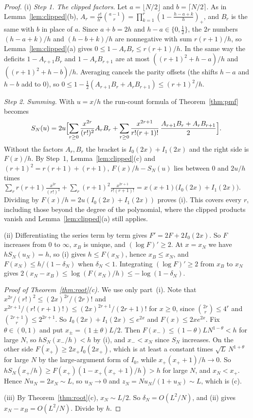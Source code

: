 \begin{proof}
(i) \emph{Step 1. The clipped factors.} Let $a=\lfloor N/2\rfloor$ and
$b=\lceil N/2\rceil$. As in Lemma~\ref{lem:clipped}(b),
$A_r=\frac{r!}{h^r}\binom{a-1}{r}=\prod_{k=1}^r(1-\frac{h-a+k}h)_+$, and $B_r$
is the same with $b$ in place of $a$. Since $a+b=2h$ and $h-a\in\{0,\frac12\}$,
the $2r$ numbers $(h-a+k)/h$ and $(h-b+k)/h$ are nonnegative with sum
$r(r+1)/h$, so Lemma~\ref{lem:clipped}(a) gives $0\le1-A_rB_r\le r(r+1)/h$. In
the same way the deficits $1-A_{r+1}B_r$ and $1-A_rB_{r+1}$ are at most
$((r+1)^2+h-a)/h$ and $((r+1)^2+h-b)/h$. Averaging cancels the parity offsets
(the shifts $h-a$ and $h-b$ add to $0$), so $0\le1-\frac12(A_{r+1}B_r+A_rB_{r+1})\le(r+1)^2/h$.

\emph{Step 2. Summing.} With $u=x/h$ the run-count formula of
Theorem~\ref{thm:pmf} becomes
\[
S_N(u)=2u\Bigl[\sum_{r\ge0}\frac{x^{2r}}{(r!)^2}A_rB_r
+\sum_{r\ge0}\frac{x^{2r+1}}{r!(r+1)!}\,\frac{A_{r+1}B_r+A_rB_{r+1}}2\Bigr].
\]
Without the factors $A_r,B_r$ the bracket is $I_0(2x)+I_1(2x)$ and the right
side is $F(x)/h$. By Step~1, Lemma~\ref{lem:clipped}(c) and $(r+1)^2=r(r+1)+(r+1)$, $F(x)/h-S_N(u)$
lies between $0$ and $2u/h$ times
$\sum_rr(r+1)\frac{x^{2r}}{(r!)^2}+\sum_r(r+1)^2\frac{x^{2r+1}}{r!(r+1)!}=x(x+1)\bigl(I_0(2x)+I_1(2x)\bigr)$.
Dividing by $F(x)/h=2u(I_0(2x)+I_1(2x))$ proves (i). This covers every $r$,
including those beyond the degree of the polynomial, where the clipped products
vanish and Lemma~\ref{lem:clipped}(a) still applies.

(ii) Differentiating the series term by term gives $F'=2F+2I_0(2x)$. So $F$
increases from $0$ to $\infty$, $x_B$ is unique, and $(\log F)'\ge2$. At
$x=x_N$ we have $hS_N(u_N)=h$, so (i) gives $h\le F(x_N)$, hence $x_B\le x_N$,
and $F(x_N)\le h/(1-\delta_N)$ when $\delta_N<1$. Integrating $(\log F)'\ge2$
from $x_B$ to $x_N$ gives $2(x_N-x_B)\le\log(F(x_N)/h)\le-\log(1-\delta_N)$.

\emph{Proof of Theorem~\ref{thm:root}(c).} We use only part~(i). Note that
$x^{2r}/(r!)^2\le(2x)^{2r}/(2r)!$ and
$x^{2r+1}/(r!(r+1)!)\le(2x)^{2r+1}/(2r+1)!$ for $x\ge0$, since
$\binom{2r}r\le4^r$ and $\binom{2r+1}r\le2^{2r+1}$. So
$I_0(2x)+I_1(2x)\le e^{2x}$ and $F(x)\le2xe^{2x}$. Fix $\theta\in(0,1)$ and
put $x_\pm=(1\pm\theta)L/2$. Then $F(x_-)\le(1-\theta)LN^{1-\theta}<h$ for
large $N$, so $hS_N(x_-/h)<h$ by (i), and $x_-<x_N$ since $S_N$ increases. On
the other side $F(x_+)\ge2x_+I_0(2x_+)$, which is at least a constant times
$\sqrt L\,N^{1+\theta}$ for large $N$ by the large-argument form of $I_0$,
while $x_+(x_++1)/h\to0$. So $hS_N(x_+/h)\ge F(x_+)(1-x_+(x_++1)/h)>h$ for
large $N$, and $x_N<x_+$. Hence $Nu_N=2x_N\sim L$, so $u_N\to0$ and
$z_N=Nu_N/(1+u_N)\sim L$, which is (c).

(iii) By Theorem~\ref{thm:root}(c), $x_N\sim L/2$. So $\delta_N=O(L^2/N)$,
and (ii) gives $x_N-x_B=O(L^2/N)$. Divide by $h$.
\end{proof}

